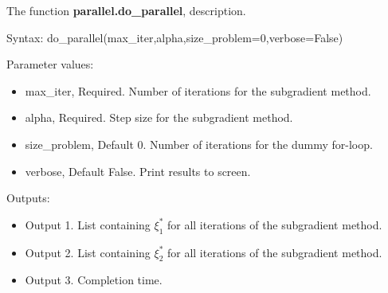 \documentclass[12pt]{article}
\begin{document}
The function \textbf{parallel.do\_parallel}, description.

Syntax: do\_parallel(max\_iter,alpha,size\_problem=0,verbose=False)

Parameter values:
\begin{itemize}
	\item max\_iter, Required. Number of iterations for the subgradient method.
	\item alpha, Required. Step size for the subgradient method.
	\item size\_problem, Default 0. Number of iterations for the dummy for-loop.
	\item verbose, Default False. Print results to screen.
\end{itemize}

Outputs:
\begin{itemize}
	\item Output 1. List containing $\xi_1^*$ for all iterations of the subgradient method.
	\item Output 2. List containing $\xi_2^*$ for all iterations of the subgradient method.
	\item Output 3. Completion time.
\end{itemize}
\end{document}

